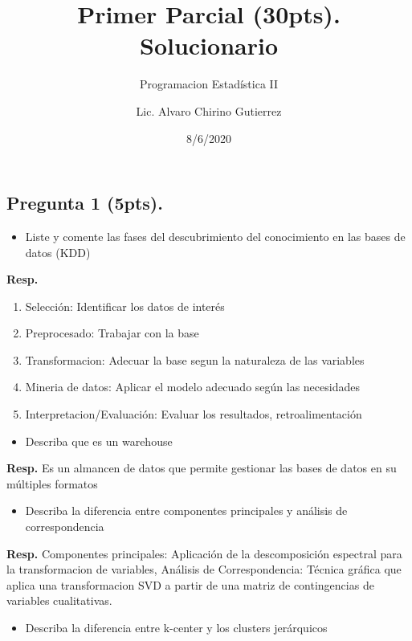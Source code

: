 \documentclass[
]{article}
\title{Primer Parcial (30pts). Solucionario}
\subtitle{Programacion Estadística II}
\author{Lic. Alvaro Chirino Gutierrez}
\date{8/6/2020}
\providecommand{\tightlist}{%
  \setlength{\itemsep}{0pt}\setlength{\parskip}{0pt}}
\begin{document}
\maketitle

\hypertarget{pregunta-1-5pts.}{%
\subsection{Pregunta 1 (5pts).}\label{pregunta-1-5pts.}}

\begin{itemize}
\tightlist
\item
  Liste y comente las fases del descubrimiento del conocimiento en las
  bases de datos (KDD)
\end{itemize}

\textbf{Resp.}

\begin{enumerate}
\def\labelenumi{\arabic{enumi}.}
\tightlist
\item
  Selección: Identificar los datos de interés
\item
  Preprocesado: Trabajar con la base
\item
  Transformacion: Adecuar la base segun la naturaleza de las variables
\item
  Mineria de datos: Aplicar el modelo adecuado según las necesidades
\item
  Interpretacion/Evaluación: Evaluar los resultados, retroalimentación
\end{enumerate}

\begin{itemize}
\tightlist
\item
  Describa que es un warehouse
\end{itemize}

\textbf{Resp.} Es un almancen de datos que permite gestionar las bases
de datos en su múltiples formatos

\begin{itemize}
\tightlist
\item
  Describa la diferencia entre componentes principales y análisis de
  correspondencia
\end{itemize}

\textbf{Resp.} Componentes principales: Aplicación de la descomposición
espectral para la transformacion de variables, Análisis de
Correspondencia: Técnica gráfica que aplica una transformacion SVD a
partir de una matriz de contingencias de variables cualitativas.

\begin{itemize}
\tightlist
\item
  Describa la diferencia entre k-center y los clusters jerárquicos
\end{itemize}
\end{document}
